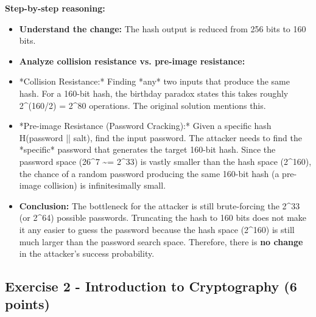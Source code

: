 \documentclass{article}
\begin{document}
\textbf{Step-by-step reasoning:}

\begin{itemize}
    \item[\textbf{1.}] \textbf{Understand the change:} The hash output is reduced from 256 bits to 160 bits.
    \item[\textbf{2.}] \textbf{Analyze collision resistance vs. pre-image resistance:}
    \item *Collision Resistance:* Finding *any* two inputs that produce the same hash. For a 160-bit hash, the birthday paradox states this takes roughly 2\textasciicircum{}(160/2) = 2\textasciicircum{}80 operations. The original solution mentions this.
    \item *Pre-image Resistance (Password Cracking):* Given a specific hash H(password || salt), find the input password. The attacker needs to find the *specific* password that generates the target 160-bit hash. Since the password space (26\textasciicircum{}7 \textasciitilde{}= 2\textasciicircum{}33) is vastly smaller than the hash space (2\textasciicircum{}160), the chance of a random password producing the same 160-bit hash (a pre-image collision) is infinitesimally small.
    \item[\textbf{3.}] \textbf{Conclusion:} The bottleneck for the attacker is still brute-forcing the 2\textasciicircum{}33 (or 2\textasciicircum{}64) possible passwords. Truncating the hash to 160 bits does not make it any easier to guess the password because the hash space (2\textasciicircum{}160) is still much larger than the password search space. Therefore, there is \textbf{no change} in the attacker's success probability.
\end{itemize}

\subsection{Exercise 2 - Introduction to Cryptography (6 points)}
\end{document}
